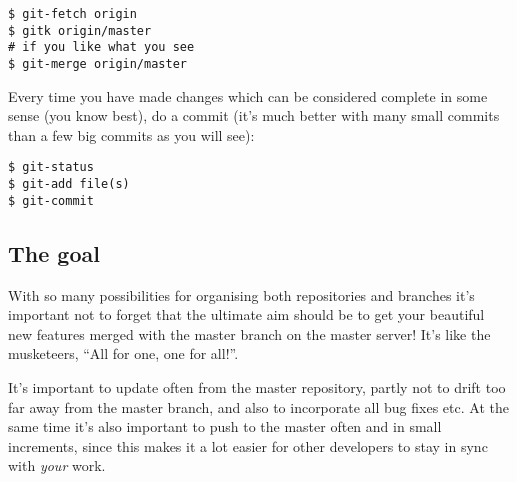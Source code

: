 \documentclass[a4paper,10pt]{article}
\begin{document}
\begin{verbatim}
$ git-fetch origin
$ gitk origin/master
# if you like what you see
$ git-merge origin/master 
\end{verbatim}

Every time you have made changes which can be considered complete in some
sense (you know best), do a commit (it's much better with many small commits
than a few big commits as you will see):

\begin{verbatim}
$ git-status
$ git-add file(s)
$ git-commit 
\end{verbatim}

\subsection{The goal}
With so many possibilities for organising both repositories and branches it's
important not to forget that the ultimate aim should be to get your beautiful
new features merged with the master branch on the master server! It's like the
musketeers, ``All for one, one for all!''. 

It's important to update often from the master repository, partly not to drift
too far away from the master branch, and also to incorporate all bug fixes
etc. At the same time it's also important to push to the master often and in
small increments, since this makes it a lot easier for other developers to
stay in sync with \emph{your} work.
\end{document}
